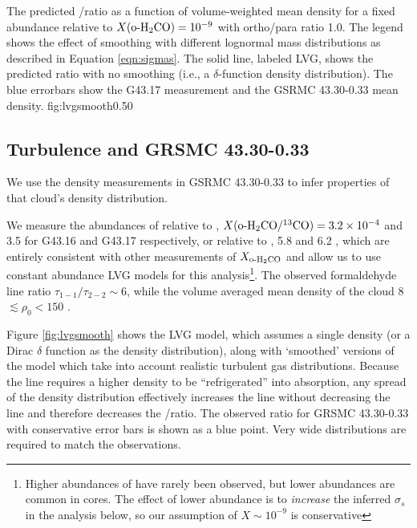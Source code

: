 {The predicted \formaldehyde \oneone/\twotwo ratio as a function of volume-weighted mean
density for a fixed abundance relative to \hh $X(\textrm{o-H}_2\textrm{CO}) = 10^{-9}$  with \hh
ortho/para ratio 1.0.  The legend shows the effect of smoothing with different
lognormal mass distributions as described in Equation \ref{eqn:sigmas}.  %
The solid line, labeled LVG, shows the predicted ratio
with no smoothing (i.e., a $\delta$-function density distribution).
The blue errorbars show the G43.17 \formaldehyde measurement and the GSRMC
43.30-0.33 mean density.
}
{fig:lvgsmooth}{0.5}{0}

\subsection{Turbulence and GRSMC 43.30-0.33}
We use the density measurements in GSRMC 43.30-0.33 to infer properties of that
cloud's density distribution.

We measure the abundances of \ortho relative to \thirteenco,
$X(\textrm{o-H}_2\textrm{CO}/^{13}\textrm{CO}) = 3.2\times10^{-4}$ and 3.5 for G43.16 and G43.17
respectively, or relative to \hh, 5.8 and 6.2 , which are
entirely consistent with other measurements of $X_{\textrm{o-H}_2\textrm{CO}}$
\citep{Johnstone2003a} and allow us to use constant abundance LVG models for this
analysis\footnote{Higher abundances of \formaldehyde have rarely been observed,
but lower abundances are common in cores.  The effect of lower abundance is to
\emph{increase} the inferred $\sigma_s$ in the analysis below, so our
assumption of $X\sim10^{-9}$ is conservative}.  The observed
formaldehyde line ratio $\tau_{1-1}/\tau_{2-2} \sim 6$, while the volume
averaged mean density of the cloud 8 \percc $\lesssim \rho_0 <
150$ \percc.

Figure \ref{fig:lvgsmooth} shows the LVG model, which assumes a single density
(or a Dirac $\delta$ function as the density distribution), along with
`smoothed' versions of the model which take into account realistic turbulent
gas distributions.  Because the \formaldehyde \twotwo line requires a higher
density to be ``refrigerated'' into absorption, any spread of the density
distribution effectively increases the \twotwo line without decreasing the
\oneone line and therefore decreases the \oneone/\twotwo ratio.  The observed
ratio for GRSMC 43.30-0.33 with conservative error bars is shown as a blue
point.  Very wide distributions are required to match the observations.

